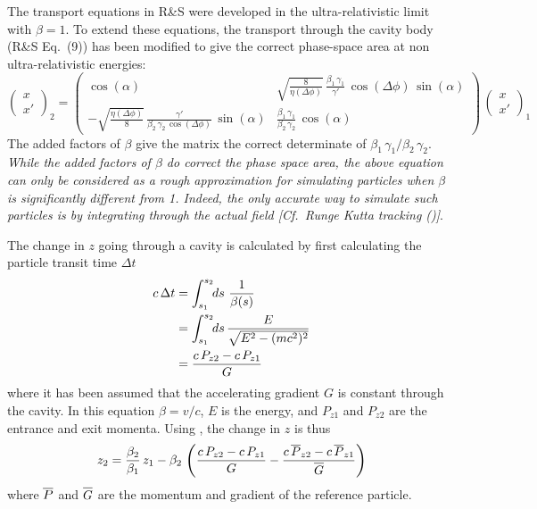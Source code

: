 The transport equations in R\&S were developed in the ultra-relativistic limit with $\beta = 1$.  To
extend these equations, the transport through the cavity body (R\&S Eq.~(9)) has been modified to
give the correct phase-space area at non ultra-relativistic energies:
\begin{equation}
  \begin{pmatrix}
    x \\ 
    x'
  \end{pmatrix}_2 = 
  \begin{pmatrix}
    \cos(\alpha)  &  
    \sqrt{\frac{8}{\eta(\Delta\phi)}} \, \frac{\beta_1 \, \gamma_1}{\gamma'} \, 
                                                   \cos(\Delta\phi) \, \sin(\alpha) \\
    -\sqrt{\frac{\eta(\Delta\phi)}{8}} \, 
                     \frac{\gamma'}{\beta_2 \, \gamma_2 \, \cos(\Delta\phi)} \, \sin(\alpha) &
    \frac{\beta_1 \, \gamma_1}{\beta_2 \, \gamma_2} \, \cos(\alpha)
  \end{pmatrix}
  \,
  \begin{pmatrix}
    x \\ 
    x'
  \end{pmatrix}_1
  \label{xxpc}
\end{equation}
The added factors of $\beta$ give the matrix the correct determinate of $\beta_1 \, \gamma_1 /
\beta_2 \, \gamma_2$. {\em While the added factors of $\beta$ do correct the phase space area, the
above equation can only be considered as a rough approximation for simulating particles when $\beta$
is significantly different from 1. Indeed, the only accurate way to simulate such particles is by
integrating through the actual field [Cf.~Runge Kutta tracking ()]}. 

The change in $z$ going through a cavity is calculated by first calculating the particle
transit time $\Delta t$
\begin{align}
  c \, \Delta t &= \int_{s_1}^{s_2} \!\! ds \,\, \frac{1}{\beta(s)} \nonumber \\
  &= \int_{s_1}^{s_2} \!\! ds \, \frac{E}{\sqrt{E^2 - (mc^2)^2}} \\
  &= \frac{c \, P_{z2} - c \, P_{z1}}{G} \nonumber
\end{align}
where it has been assumed that the accelerating gradient $G$ is constant through the cavity. In this
equation $\beta = v / c$, $E$ is the energy, and $P_{z1}$ and $P_{z2}$ are the entrance and exit
momenta. Using , the change in $z$ is thus
\begin{equation}
  z_2 = \frac{\beta_2}{\beta_1} \, z_1 - 
  \beta_2 \, 
  \left(
  \frac{c \, P_{z2} - c \, P_{z1}}{G} - 
  \frac{c \, \Pbar_{z2} - c \, \Pbar_{z1}}{\BAR G}
  \right)
\end{equation}
where $\overline{P}$ and $\BAR G$ are the momentum and gradient of the
reference particle.

